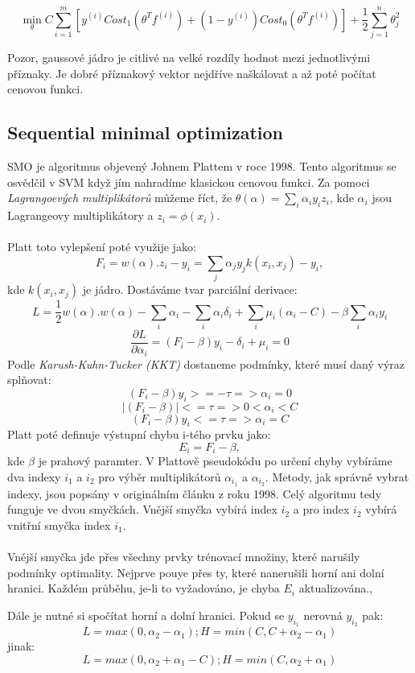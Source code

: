 \documentclass[a4]{article}
\begin{document}
$$\min_{\theta} C \sum_{i=1}^{m}[y^{(i)} Cost_1 (\theta^T f^{(i)})+(1-y^{(i)}) Cost_0 (\theta^T f^{(i)})] + \frac{1}{2} \sum_{j=1}^{n}\theta_{j}^{2}$$

Pozor, gaussové jádro je citlivé na velké rozdíly hodnot mezi jednotlivými příznaky. Je dobré příznakový vektor nejdříve naškálovat a až poté počítat cenovou funkci.

\subsection{Sequential minimal optimization}
SMO je algoritmus objevený Johnem Plattem v roce 1998. Tento algoritmus se osvědčil v SVM když jím nahradíme klasickou cenovou funkci. Za pomoci \textit{Lagrangoevých multiplikátorů} můžeme říct, že $\theta(\alpha)=\sum_{i}\alpha_{i}y_{i}z_{i}$, kde $\alpha_i$ jsou Lagrangeovy multiplikátory a $z_{i}=\phi(x_{i})$.
\\\\
Platt toto vylepšení poté využije jako:
$$
F_i =w(\alpha) . z_i - y_i = \sum_{j}\alpha_{j}y_{j}k(x_i,x_j)-y_{i},
$$
kde $k(x_i,x_j)$ je jádro. Dostáváme tvar parciální derivace:
$$
L = \frac{1}{2}w(\alpha).w(\alpha)-\sum_{i}\alpha_{i}-\sum_{i}\alpha_{i}\delta_{i}+\sum_{i}\mu_{i}(\alpha_{i}-C)-\beta\sum_{i}\alpha_{i}y_{i}
$$
$$
\frac{\partial L}{\partial \alpha_{i}}=(F_{i}-\beta)y_{i}-\delta_{i}+\mu_{i}=0
$$
Podle \textit{Karush-Kuhn-Tucker (KKT)} dostaneme podmínky, které musí daný výraz splňovat:
$$
(F_i-\beta)y_{i}>=-\tau => \alpha_{i} = 0
$$
$$
|(F_i-\beta)|<=\tau => 0 < \alpha_{i} < C
$$
$$
(F_i-\beta)y_{i}<=\tau => \alpha_{i} = C
$$
Platt poté definuje výstupní chybu i-tého prvku jako:
$$
E_{i} = F_{i} - \beta,
$$
kde $\beta$ je prahový paramter. V Plattově pseudokódu po určení chyby vybíráme dva indexy $i_1$ a $i_2$ pro výběr multiplikátorů $\alpha_{i_1}$ a $\alpha_{i_2}$. Metody, jak správně vybrat indexy, jsou popsány v originálním článku z roku 1998. Celý algoritmu tedy funguje ve dvou smyčkách. Vnější smyčka vybírá index $i_2$ a pro index $i_2$ vybírá vnitřní smyčka index $i_1$.
\\\\
Vnější smyčka jde přes všechny prvky trénovací množiny, které narušily podmínky optimality. Nejprve pouye přes ty, které nanerušili horní ani dolní hranici. Každém průběhu, je-li to vyžadováno, je chyba $E_i$ aktualizována.\cite{smo_platt},\cite{andrew}

\noindent Dále je nutné si spočítat horní a dolní hranici. Pokud se $y_{i_1}$ nerovná $y_{i_2}$ pak:
$$
L=max(0,\alpha_2 - \alpha_1) ; H=min(C, C+\alpha_2 - \alpha_1)
$$
jinak:
$$
L=max(0,\alpha_2 + \alpha_1 - C) ; H=min(C, \alpha_2 + \alpha_1)
$$
\end{document}
